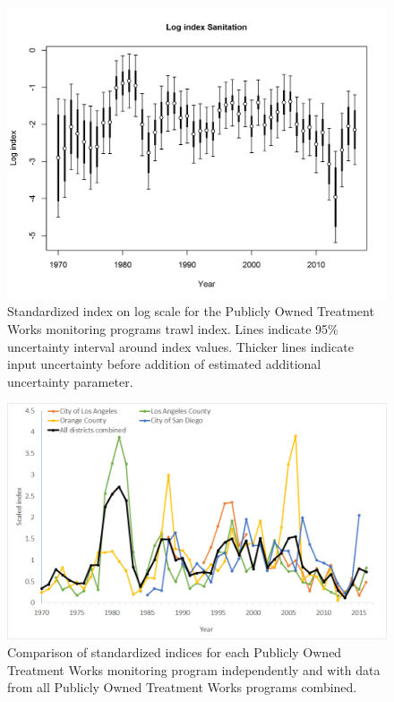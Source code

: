 \documentclass[12pt,]{article}
\begin{document}
\begin{figure}[htbp]
\centering
\includegraphics{r4ss/plots_mod1/index4_logcpuedata_Sanitation.png}
\caption{Standardized index on log scale for the Publicly Owned
Treatment Works monitoring programs trawl index. Lines indicate 95\%
uncertainty interval around index values. Thicker lines indicate input
uncertainty before addition of estimated additional uncertainty
parameter. \label{fig:index4_logcpuedata_Sanitation}}
\end{figure}

\begin{figure}[htbp]
\centering
\includegraphics{Figures/Fleet7_Sanitation_indexcompare.png}
\caption{Comparison of standardized indices for each Publicly Owned
Treatment Works monitoring program independently and with data from all
Publicly Owned Treatment Works programs combined.
\label{fig:Fleet7_Sanitation_indexcompare}}
\end{figure}
\end{document}
